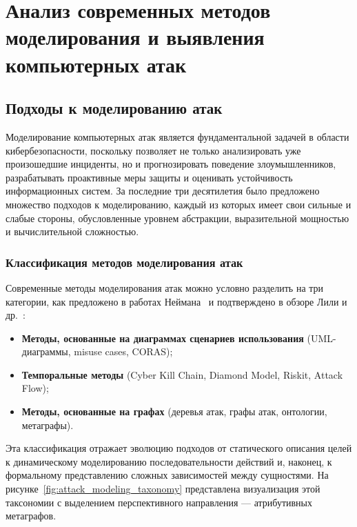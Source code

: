 
\chapter{Анализ современных методов моделирования и выявления компьютерных атак}\label{ch:ch1}

\section{Подходы к моделированию атак}\label{sec:ch1/sec1}
Моделирование компьютерных атак является фундаментальной задачей в области кибербезопасности, поскольку позволяет не только анализировать уже произошедшие инциденты, но и прогнозировать поведение злоумышленников, разрабатывать проактивные меры защиты и оценивать устойчивость информационных систем. За последние три десятилетия было предложено множество подходов к моделированию, каждый из которых имеет свои сильные и слабые стороны, обусловленные уровнем абстракции, выразительной мощностью и вычислительной сложностью.

\subsection{Классификация методов моделирования атак}

Современные методы моделирования атак можно условно разделить на три категории, как предложено в работах Неймана~\cite{Neiman2024a,Neiman2024b,Neiman2024c} и подтверждено в обзоре Лили и др.~\cite{Lallie2019}:
\begin{itemize}
    \item \textbf{Методы, основанные на диаграммах сценариев использования} (UML-диаграммы, misuse cases, CORAS);
    \item \textbf{Темпоральные методы} (Cyber Kill Chain, Diamond Model, Riskit, Attack Flow);
    \item \textbf{Методы, основанные на графах} (деревья атак, графы атак, онтологии, метаграфы).
\end{itemize}

Эта классификация отражает эволюцию подходов от статического описания целей к динамическому моделированию последовательности действий и, наконец, к формальному представлению сложных зависимостей между сущностями. На рисунке~\ref{fig:attack_modeling_taxonomy} представлена визуализация этой таксономии с выделением перспективного направления — атрибутивных метаграфов.

